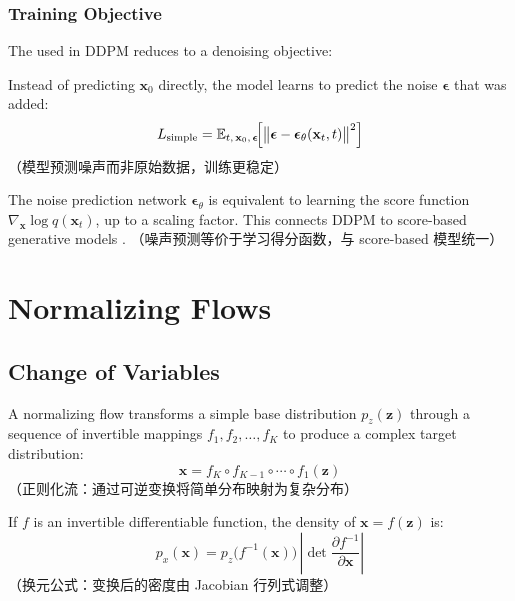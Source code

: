 \documentclass[rep, style=ml]{lexnote}
\begin{document}
\subsection{Training Objective}

The  used in DDPM \cite{hoDenoisingDiffusionProbabilistic2020} reduces to a denoising objective:

\begin{notebox}
  Instead of predicting $\mathbf{x}_0$ directly, the model learns to predict
  the noise $\boldsymbol{\epsilon}$ that was added:
  \[
    L_{\text{simple}}
    = \mathbb{E}_{t,\,\mathbf{x}_0,\,\boldsymbol{\epsilon}}\!\Bigl[
      \bigl\|\boldsymbol{\epsilon}
        - \boldsymbol{\epsilon}_\theta(\mathbf{x}_t, t)\bigr\|^2
    \Bigr]
  \]
  （模型预测噪声而非原始数据，训练更稳定）
\end{notebox}

\begin{rem}
  The noise prediction network $\boldsymbol{\epsilon}_\theta$ is equivalent
  to learning the score function
  $\nabla_{\mathbf{x}} \log q(\mathbf{x}_t)$, up to a scaling factor.
  This connects DDPM to score-based generative models
  \cite{songScoreBasedGenerativeModeling2020}.
  （噪声预测等价于学习得分函数，与 score-based 模型统一）
\end{rem}

\chapter{Normalizing Flows}

\section{Change of Variables}

\begin{defn}
  A normalizing flow transforms a simple base distribution $p_z(\mathbf{z})$
  through a sequence of invertible mappings $f_1, f_2, \ldots, f_K$ to
  produce a complex target distribution:
  \[
    \mathbf{x} = f_K \circ f_{K-1} \circ \cdots \circ f_1(\mathbf{z})
  \]
  （正则化流：通过可逆变换将简单分布映射为复杂分布）
\end{defn}

\begin{thm}
  If $f$ is an invertible differentiable function, the density of
  $\mathbf{x} = f(\mathbf{z})$ is:
  \[
    p_x(\mathbf{x})
    = p_z\!\bigl(f^{-1}(\mathbf{x})\bigr)\,
      \left|\det \frac{\partial f^{-1}}{\partial \mathbf{x}}\right|
  \]
  （换元公式：变换后的密度由 Jacobian 行列式调整）
\end{thm}
\end{document}
